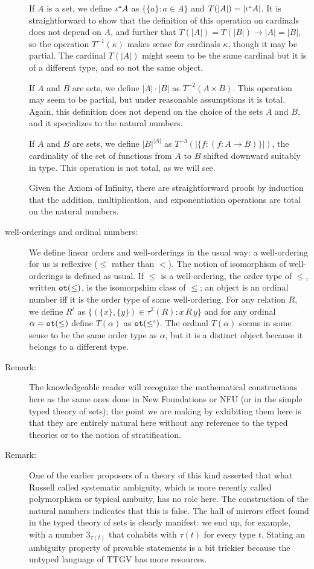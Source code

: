 \documentclass[12pt]{article}
\begin{document}
\begin{description}
If $A$ is a set, we define $\iota``A$ as $\{\{a\}:a \in A\}$ and $T(|A|) = |\iota``A|$.  It is straightforward to show that the definition of this operation on cardinals does not depend on $A$, and further that $T(|A|) = T(|B|) \rightarrow |A|=|B|$, so the operation $T^{-1}(\kappa)$ makes sense for cardinals $\kappa$, though it may be partial.  The cardinal
$T(|A|)$ might seem to be the same cardinal but it is of a different type, and so not the same object.

If $A$ and $B$ are sets, we define $|A| \cdot |B|$ as $T^{-2}(A \times B)$.  This operation may seem to be partial, but under reasonable assumptions it is total.  Again, this definition does not depend on the choice of the sets $A$ and $B$, and it specializes to the natural numbers.

If $A$ and $B$ are sets, we define $|B|^{|A|}$ as $T^{-3}(|\{f:(f:A \rightarrow B)\}|)$, the cardinality of the set of functions from $A$ to $B$ shifted downward suitably in type.  This operation is not total, as we will see.

Given the Axiom of Infinity, there are straightforward proofs by induction that the addition, multiplication, and exponentiation operations are total on the natural numbers.

\item[well-orderings and ordinal numbers:]  We define linear orders and well-orderings in the usual way:  a well-ordering for us is reflexive ($\leq$ rather than $<$).  The notion of isomorphism of well-orderings is defined as usual.  If $\leq$ is a well-ordering, the order type of $\leq$, written ${\tt ot}(\leq)$, is the isomorpshim class of $\leq$;  an object is an ordinal number iff it is the order type of some well-ordering.  For any relation $R$, we define $R^{\iota}$ as $\{(\{x\},\{y\}) \in \tau^2(R):x \, R \, y\}$ and for any ordinal $\alpha ={\tt ot}(\leq)$ define $T(\alpha)$ as ${\tt ot}(\leq^\iota)$.  The ordinal $T(\alpha)$ seems in some sense to be the same order type as $\alpha$, but it is a distinct object because it belongs to a different type.

\item[Remark:]  The knowledgeable reader will recognize the mathematical constructions here as the same ones done in New Foundations or NFU (or in the simple typed theory of sets);  the point we are making by exhibiting them here is that they are entirely natural here without any reference to the typed theories or to the notion of stratification.

\item[Remark:]  One of the earlier proposers of a theory of this kind asserted that what Russell called systematic ambiguity, which is more recently called polymorphism or typical ambuity, has no role here.  The construction of the natural numbers indicates that this is false.  The hall of mirrors effect found in the typed theory of sets
is clearly manifest:  we end up, for example, with a number $3_{\tau(t)}$ that cohabits with $\tau(t)$ for every type $t$.  Stating an ambiguity property of provable statements is a bit trickier because the untyped language of TTGV has more resources.

\end{description}
\end{document}
